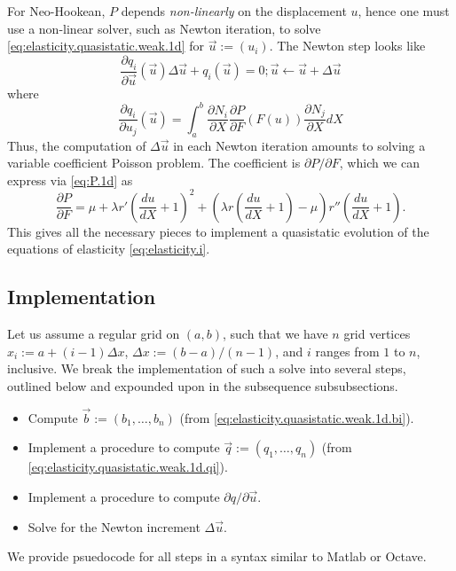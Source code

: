 For Neo-Hookean, $P$ depends \emph{non-linearly} on the displacement $u$, hence one must use a non-linear solver, such as Newton iteration, to solve \eqref{eq:elasticity.quasistatic.weak.1d} for $\vec{u} := \left( u_i \right)$. The Newton step looks like
\begin{subequations}
\begin{equation*}
\frac{\partial q_i}{\partial\vec{u}} \left( \vec{u} \right) \Delta \vec{u} + q_i \left( \vec{u} \right) = 0;
\end{equation*}
\begin{equation*}
\vec{u} \leftarrow \vec{u} + \Delta \vec{u}
\end{equation*}
\end{subequations}
where
\begin{equation*}
\frac{\partial q_i}{\partial u_j} \left( \vec{u} \right) = \int_a^b \frac{\partial N_i}{\partial X} \frac{\partial P}{\partial F} \left( F(u) \right) \frac{\partial N_j}{\partial X} dX
\end{equation*}
Thus, the computation of $\Delta \vec{u}$ in each Newton iteration amounts to solving a variable coefficient Poisson problem. The coefficient is $\partial P/\partial F$, which we can express via \eqref{eq:P.1d} as
\begin{equation*}
\frac{\partial P}{\partial F} = \mu + \lambda r' \left( \frac{du}{dX} + 1 \right)^2 + \left( \lambda r \left( \frac{du}{dX} + 1 \right) - \mu \right) r'' \left( \frac{du}{dX} + 1 \right).
\end{equation*}
This gives all the necessary pieces to implement a quasistatic evolution of the equations of elasticity \eqref{eq:elasticity.i}.

\subsection{Implementation}

Let us assume a regular grid on $(a,b)$, such that we have $n$ grid vertices $x_i := a + (i - 1) \Delta x$, $\Delta x := (b - a)/(n - 1)$, and $i$ ranges from $1$ to $n$, inclusive. We break the implementation of such a solve into several steps, outlined below and expounded upon in the subsequence subsubsections.
\begin{itemize}
\item Compute $\vec{b} := \left( b_1, \dotsc, b_n \right)$ (from \eqref{eq:elasticity.quasistatic.weak.1d.bi}).
\item Implement a procedure to compute $\vec{q} := \left( q_1, \dotsc, q_n \right)$ (from \eqref{eq:elasticity.quasistatic.weak.1d.qi}).
\item Implement a procedure to compute $\partial q/\partial\vec{u}$.
\item Solve for the Newton increment $\Delta \vec{u}$.
\end{itemize}
We provide psuedocode for all steps in a syntax similar to Matlab or Octave.

